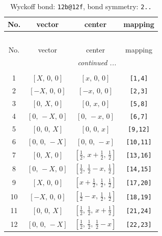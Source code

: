 \documentclass[fleqn,8pt]{jsarticle}
\begin{document}
\renewcommand{\arraystretch}{1.2}
\begin{longtable}{cccc}
\caption{Wyckoff bond: {\tt 12b@12f}, bond symmetry: {\tt 2..}}
 \\
 \hline \hline
No. & vector & center & mapping \\ \hline \endfirsthead

\multicolumn{3}{l}{\tablename\ \thetable{}} \\
 \hline \hline
No. & vector & center & mapping \\ \hline \endhead

 \hline \hline
\multicolumn{3}{r}{\footnotesize\it continued ...} \\ \endfoot

 \hline \hline
\multicolumn{3}{r}{} \\ \endlastfoot

1 & $\left[ X,\, 0,\, 0 \right]$ & $\left[ x,\, 0,\, 0 \right]$ & {\tt [1,4]} \\ \hline
2 & $\left[ - X,\, 0,\, 0 \right]$ & $\left[ - x,\, 0,\, 0 \right]$ & {\tt [2,3]} \\ \hline
3 & $\left[ 0,\, X,\, 0 \right]$ & $\left[ 0,\, x,\, 0 \right]$ & {\tt [5,8]} \\ \hline
4 & $\left[ 0,\, - X,\, 0 \right]$ & $\left[ 0,\, - x,\, 0 \right]$ & {\tt [6,7]} \\ \hline
5 & $\left[ 0,\, 0,\, X \right]$ & $\left[ 0,\, 0,\, x \right]$ & {\tt [9,12]} \\ \hline
6 & $\left[ 0,\, 0,\, - X \right]$ & $\left[ 0,\, 0,\, - x \right]$ & {\tt [10,11]} \\ \hline
7 & $\left[ 0,\, X,\, 0 \right]$ & $\left[ \frac{1}{2},\, x + \frac{1}{2},\, \frac{1}{2} \right]$ & {\tt [13,16]} \\ \hline
8 & $\left[ 0,\, - X,\, 0 \right]$ & $\left[ \frac{1}{2},\, \frac{1}{2} - x,\, \frac{1}{2} \right]$ & {\tt [14,15]} \\ \hline
9 & $\left[ X,\, 0,\, 0 \right]$ & $\left[ x + \frac{1}{2},\, \frac{1}{2},\, \frac{1}{2} \right]$ & {\tt [17,20]} \\ \hline
10 & $\left[ - X,\, 0,\, 0 \right]$ & $\left[ \frac{1}{2} - x,\, \frac{1}{2},\, \frac{1}{2} \right]$ & {\tt [18,19]} \\ \hline
11 & $\left[ 0,\, 0,\, X \right]$ & $\left[ \frac{1}{2},\, \frac{1}{2},\, x + \frac{1}{2} \right]$ & {\tt [21,24]} \\ \hline
12 & $\left[ 0,\, 0,\, - X \right]$ & $\left[ \frac{1}{2},\, \frac{1}{2},\, \frac{1}{2} - x \right]$ & {\tt [22,23]} \\
\end{longtable}
\end{document}
